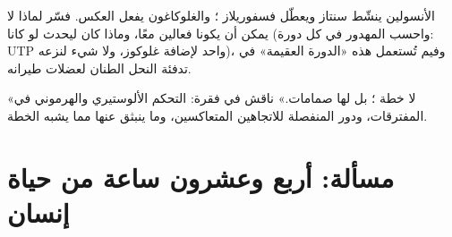 \begin{exercise}[$\star\star\star$]\label{exo:b1:biosyntheses-integration:11}
الأنسولين ينشّط سنتاز  ويعطّل فسفوريلاز ؛
والغلوكاغون يفعل العكس. فسّر لماذا لا يمكن أن يكونا فعالين معًا،
وماذا كان ليحدث لو كانا (واحسب  المهدور في كل دورة: UTP واحد
لإضافة غلوكوز، ولا شيء لنزعه)، وفيم تُستعمل هذه «الدورة العقيمة» في
تدفئة النحل الطنان لعضلات طيرانه.
\end{exercise}

\begin{exercise}[$\star\star\star$]\label{exo:b1:biosyntheses-integration:12}
«لا خطة ؛ بل لها صمامات.» ناقش في فقرة: التحكم الألوستيري
والهرموني في  المفترقات، ودور  المنفصلة للاتجاهين
المتعاكسين، وما ينبثق عنها مما يشبه الخطة.
\end{exercise}

\section{مسألة: أربع وعشرون ساعة من حياة إنسان}

